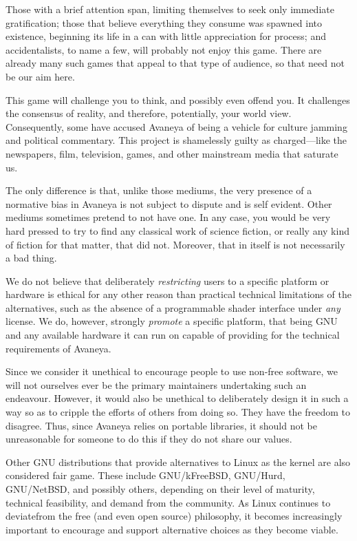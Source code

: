 Those with a brief attention span, limiting themselves to seek only immediate gratification; those that believe everything they consume was spawned into existence, beginning its life in a can with little appreciation for process; and accidentalists, to name a few, will probably not enjoy this game. There are already many such games that appeal to that type of audience, so that need not be our aim here.

This game will challenge you to think, and possibly even offend you. It challenges the consensus of reality, and therefore, potentially, your world view. Consequently, some have accused Avaneya of being a vehicle for culture jamming and political commentary. This project is shamelessly guilty as charged---like the newspapers, film, television, games, and other mainstream media that saturate us. 

The only difference is that, unlike those mediums, the very presence of a normative bias in Avaneya is not subject to dispute and is self evident. Other mediums sometimes pretend to not have one. In any case, you would be very hard pressed to try to find any classical work of science fiction, or really any kind of fiction for that matter, that did not. Moreover, that in itself is not necessarily a bad thing.

We do not believe that deliberately {\it restricting} users to a specific platform or hardware is ethical for any other reason than practical technical limitations of the alternatives, such as the absence of a programmable shader interface under {\it any} license. We do, however, strongly {\it promote} a specific platform, that being GNU and any available hardware it can run on capable of providing for the technical requirements of Avaneya.

Since we consider it unethical to encourage people to use non-free software, we will not ourselves ever be the primary maintainers undertaking such an endeavour. However, it would also be unethical to deliberately design it in such a way so as to cripple the efforts of others from doing so. They have the freedom to disagree. Thus, since Avaneya relies on portable libraries, it should not be unreasonable for someone to do this if they do not share our values.

Other GNU distributions that provide alternatives to Linux as the kernel are also considered fair game. These include GNU/kFreeBSD, GNU/Hurd, GNU/NetBSD, and possibly others, depending on their level of maturity, technical feasibility, and demand from the community. As Linux continues to deviate from the free (and even open source) philosophy, it becomes increasingly important to encourage and support alternative choices as they become viable.

